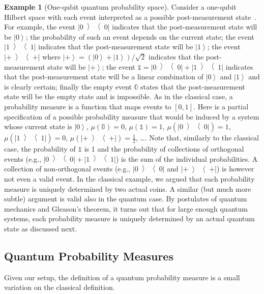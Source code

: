 \documentclass[12pt]{iopart}
\theoremstyle{plain}
\theoremstyle{definition}
\newtheorem{example}[thm]{Example}
\newcommand{\ket}[1]{{\left\vert{#1}\right\rangle}}
\newcommand{\op}[2]{\ensuremath{\left\vert{#1}\middle\rangle\middle\langle{#2}\right\vert}}
\newcommand{\proj}[1]{\op{#1}{#1}}
\newcommand{\ps}{\texttt{+}}
\begin{document}
\begin{example}[One-qubit quantum probability space] Consider a
  one-qubit Hilbert space with each event interpreted as a possible
  post-measurement state~\cite{peres1995quantum,Mermin2007,Jaeger2007}. 
  For example, the event $\proj{0}$ indicates
  that the post-measurement state will be $\ket{0}$; the probability
  of such an event depends on the current state; the event $\proj{1}$
  indicates that the post-measurement state will be $\ket{1}$; the
  event $\proj{\ps}$ where
  $\ket{\ps}=\left(\ket{0}+\ket{1}\right) / \sqrt{2}$ indicates that the
  post-measurement state will be $\ket{\ps}$; the event
  $\mathbb{1}=\proj{0}+\proj{1}$ indicates that the post-measurement
  state will be a linear combination of $\ket{0}$ and $\ket{1}$ and is
  clearly certain; finally the empty event $\mathbb{0}$ states that
  the post-measurement state will be the empty state and is
  impossible. As in the classical case, a probability measure is a
  function that maps events to $[0,1]$. Here is a partial
  specification of a possible probability measure that would be
  induced by a system whose current state is $\ket{0}$,
  $\mu\left(\mathbb{0}\right)=0$, $\mu\left(\mathbb{1}\right)=1$,
  $\mu\left(\proj{0}\right)=1$, $\mu\left(\proj{1}\right)=0$,
  $\mu\left(\proj{\ps}\right)=\frac{1}{2}$, \ldots. Note that, similarly to
  the classical case, the probability of $\mathbb{1}$ is 1 and the
  probability of collections of orthogonal events (e.g.,
  $\proj{0}+\proj{1}$) is the sum of the individual probabilities.  A
  collection of non-orthogonal events (e.g., $\proj{0}$ and
  $\proj{\ps}$) is however not even a valid event. In the classical
  example, we argued that each probability measure is uniquely
  determined by two actual coins. A similar (but much more subtle)
  argument is valid also in the quantum case. By postulates of quantum
  mechanics and Gleason's theorem, it turns out that for large enough
  quantum systems, each probability measure is uniquely determined by
  an actual quantum state as discussed next.
\end{example}

\subsection{Quantum Probability Measures}

Given our setup, the definition of a quantum probability measure is a
small variation on the classical definition. 
\end{document}
